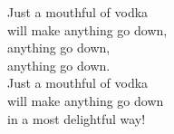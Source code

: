 
Just a mouthful of vodka \\ will make anything go down, \\ anything go down, \\ anything go down. \\ Just a mouthful of vodka \\ will make anything go down \\ in a most delightful way!